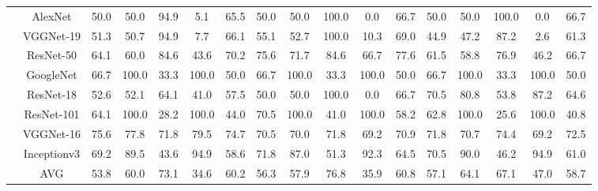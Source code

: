 \documentclass[12pt,italian]{article}
\begin{document}
\begin{tiny}
\begin{longtable}{lcccccccccccccccc}
& AlexNet & 50.0 & 50.0 & 94.9 &  5.1 & 65.5 & 50.0 & 50.0 & 100.0 &  0.0 & 66.7 & 50.0 & 50.0 & 100.0 &  0.0 & 66.7 \\ 
& VGGNet-19 & 51.3 & 50.7 & 94.9 &  7.7 & 66.1 & 55.1 & 52.7 & 100.0 & 10.3 & 69.0 & 44.9 & 47.2 & 87.2 &  2.6 & 61.3 \\ 
& ResNet-50 & 64.1 & 60.0 & 84.6 & 43.6 & 70.2 & 75.6 & 71.7 & 84.6 & 66.7 & 77.6 & 61.5 & 58.8 & 76.9 & 46.2 & 66.7 \\ 
& GoogleNet & 66.7 & 100.0 & 33.3 & 100.0 & 50.0 & 66.7 & 100.0 & 33.3 & 100.0 & 50.0 & 66.7 & 100.0 & 33.3 & 100.0 & 50.0 \\ 
& ResNet-18 & 52.6 & 52.1 & 64.1 & 41.0 & 57.5 & 50.0 & 50.0 & 100.0 &  0.0 & 66.7 & 70.5 & 80.8 & 53.8 & 87.2 & 64.6 \\ 
& ResNet-101 & 64.1 & 100.0 & 28.2 & 100.0 & 44.0 & 70.5 & 100.0 & 41.0 & 100.0 & 58.2 & 62.8 & 100.0 & 25.6 & 100.0 & 40.8 \\ 
& VGGNet-16 & 75.6 & 77.8 & 71.8 & 79.5 & 74.7 & 70.5 & 70.0 & 71.8 & 69.2 & 70.9 & 71.8 & 70.7 & 74.4 & 69.2 & 72.5 \\ 
& Inceptionv3 & 69.2 & 89.5 & 43.6 & 94.9 & 58.6 & 71.8 & 87.0 & 51.3 & 92.3 & 64.5 & 70.5 & 90.0 & 46.2 & 94.9 & 61.0 \\ 
\hline
& AVG & 53.8 & 60.0 & 73.1 & 34.6 & 60.2 & 56.3 & 57.9 & 76.8 & 35.9 & 60.8 & 57.1 & 64.1 & 67.1 & 47.0 & 58.7 \\ 
\hline
\bottomrule
\end{longtable} 

 \pagebreak 
\end{tiny} 
 
\end{document}
